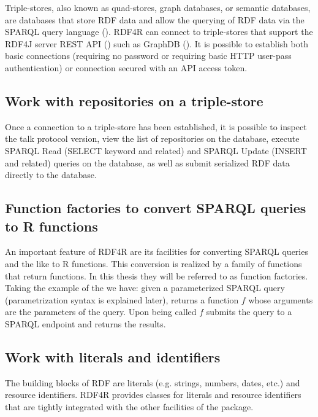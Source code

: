Triple-stores, also known as quad-stores, graph databases, or semantic databases, are databases that store RDF data and allow the querying of RDF data via the SPARQL query language (\cite{the_w3c_sparql_working_group_sparql_2013}). RDF4R can connect to triple-stores that support the RDF4J server REST API (\cite{rdf4j_development_team_rdf4j_2017}) such as GraphDB (\cite{ontotext_graphdb_2018}). It is possible to establish both basic connections (requiring no password or requiring basic HTTP user-pass authentication) or connection secured with an API access token.

\subsection{Work with repositories on a triple-store}

Once a connection to a triple-store has been established, it is possible to inspect the talk protocol version, view the list of repositories on the database, execute SPARQL Read (SELECT keyword and related) and SPARQL Update (INSERT and related) queries on the database, as well as submit serialized RDF data directly to the database.

\subsection{Function factories to convert SPARQL queries to R functions}

An important feature of RDF4R are its facilities for converting SPARQL queries and the like to R functions. This conversion is realized by a family of functions that return functions. In this thesis they will be referred to as function factories. Taking the example of the  we have: given a parameterized SPARQL query (parametrization syntax is explained later),  returns a function $f$ whose arguments are the parameters of the query. Upon being called $f$ submits the query to a SPARQL endpoint and returns the results.

\subsection{Work with literals and identifiers}

The building blocks of RDF are literals (e.g. strings, numbers, dates, etc.) and resource identifiers. RDF4R provides classes for literals and resource identifiers that are tightly integrated with the other facilities of the package.

